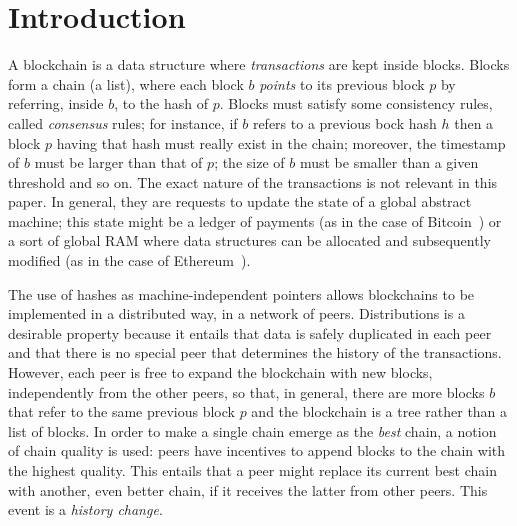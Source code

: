 \section{Introduction}\label{sec:introduction}

A blockchain is a data structure where \emph{transactions} are kept inside blocks.
Blocks form a chain (a list), where each block $b$ \emph{points} to its previous block $p$
by referring, inside $b$, to the hash of $p$. Blocks must satisfy some consistency
rules, called \emph{consensus} rules; for instance, if $b$ refers to a previous bock hash
$h$ then a block $p$ having that hash must really exist in the chain; moreover, the timestamp
of $b$ must be larger than that of $p$; the size of $b$ must be smaller than a given threshold and so on.
The exact nature of the transactions is not relevant in this paper. In general, they are
requests to update the state of a global abstract machine; this state might be a ledger of
payments (as in the case of Bitcoin~\cite{Nakamoto08,Antonopoulos17}) or a sort of global RAM where data
structures can be allocated and subsequently modified (as in the case of Ethereum~\cite{AntonopoulosW18}).

The use of hashes as machine-independent
pointers allows blockchains to be implemented in a distributed way, in a network of peers.
Distributions is a desirable property because it entails that data is safely duplicated
in each peer and that there is no special peer that determines the history of the transactions.
However, each peer is free to expand the blockchain with new blocks, independently from the other
peers, so that, in general, there
are more blocks $b$ that refer to the same previous block $p$ and the blockchain is a tree rather than
a list of blocks. In order to make a single chain emerge as the \emph{best} chain, a notion of
chain quality is used: peers have incentives to append blocks to the chain with the highest quality.
This entails that a peer might replace its current best chain with another, even better chain,
if it receives the latter from other peers. This event is a \emph{history change}.

